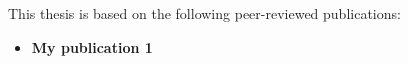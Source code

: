 \begin{relatedpublications}

This thesis is based on the following peer-reviewed publications:

\begin{itemize}\fontsize{11pt}{11pt}\selectfont
	
	\item \textbf{My publication 1}
				
\end{itemize}



\end{relatedpublications}
